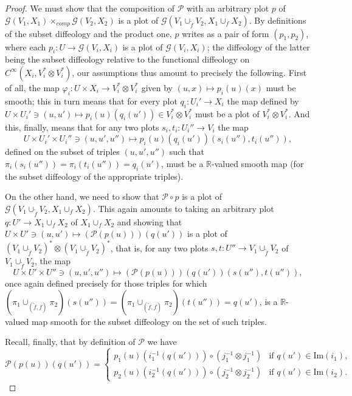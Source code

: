 \documentclass{article}
\newcommand\matR{{\mathbb{R}}}
\begin{document}
\begin{proof}
We must show that the composition of $\mathcal{P}$ with an arbitrary plot $p$ of $\mathcal{G}(V_1,X_1)\times_{comp}\mathcal{G}(V_2,X_2)$ is a plot of $\mathcal{G}(V_1\cup_{\tilde{f}}V_2,X_1\cup_f X_2)$. 
By definitions of the subset diffeology and the product one, $p$ writes as a pair of form $(p_1,p_2)$, where each $p_i:U\to\mathcal{G}(V_i,X_i)$ is a plot of $\mathcal{G}(V_i,X_i)$; the diffeology of the latter 
being the subset diffeology relative to the functional diffeology on $C^{\infty}(X_i,V_i^*\otimes V_i^*)$, our assumptions thus amount to precisely the following. First of all, the map 
$\varphi_i:U\times X_i\to V_i^*\otimes V_i^*$ given by $(u,x)\mapsto p_i(u)(x)$ must be smooth; this in turn means that for every plot $q_i:U_i'\to X_i$ the map defined by 
$U\times U_i'\ni(u,u')\mapsto p_i(u)(q_i(u'))\in V_i^*\otimes V_i^*$ must be a plot of $V_i^*\otimes V_i^*$. And this, finally, means that for any two plots $s_i,t_i:U_i''\to V_i$ the map
$$U\times U_i'\times U_i''\ni(u,u',u'')\mapsto p_i(u)(q_i(u'))(s_i(u''),t_i(u'')),$$ defined on the subset of triples $(u,u',u'')$ such that $\pi_i(s_i(u''))=\pi_i(t_i(u''))=q_i(u')$, must be a $\matR$-valued smooth map 
(for the subset diffeology of the appropriate triples).

On the other hand, we need to show that $\mathcal{P}\circ p$ is a plot of $\mathcal{G}(V_1\cup_{\tilde{f}}V_2,X_1\cup_f X_2)$. This again amounts to taking an arbitrary plot $q:U'\to X_1\cup_f X_2$ of
$X_1\cup_f X_2$ and showing that $U\times U'\ni(u,u')\mapsto(\mathcal{P}(p(u)))(q(u'))$ is a plot of $(V_1\cup_{\tilde{f}}V_2)^*\otimes(V_1\cup_{\tilde{f}}V_2)^*$, that is, for any two plots 
$s,t:U''\to V_1\cup_{\tilde{f}}V_2$ of $V_1\cup_{\tilde{f}}V_2$, the map
$$U\times U'\times U''\ni(u,u',u'')\mapsto(\mathcal{P}(p(u)))(q(u'))(s(u''),t(u'')),$$ once again defined precisely for those triples for which 
$(\pi_1\cup_{(\tilde{f},f)}\pi_2)(s(u''))=(\pi_1\cup_{(\tilde{f},f)}\pi_2)(t(u''))=q(u')$, is a $\matR$-valued map smooth for the subset diffeology on the set of such triples.

Recall, finally, that by definition of $\mathcal{P}$ we have
$$\mathcal{P}(p(u))(q(u'))=\left\{\begin{array}{ll} p_1(u)(i_1^{-1}(q(u')))\circ(j_1^{-1}\otimes j_1^{-1}) & \mbox{if }q(u')\in\mbox{Im}(i_1),\\
p_2(u)(i_2^{-1}(q(u')))\circ(j_2^{-1}\otimes j_2^{-1}) & \mbox{if }q(u')\in\mbox{Im}(i_2).\end{array}\right.$$


\end{proof}
\end{document}
